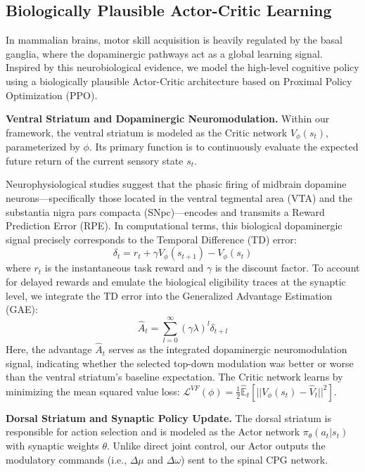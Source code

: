 \documentclass[lettersize,journal]{IEEEtran}
\begin{document}
\subsection{Biologically Plausible Actor-Critic Learning}

In mammalian brains, motor skill acquisition is heavily regulated by the basal ganglia, where the dopaminergic pathways act as a global learning signal. 
Inspired by this neurobiological evidence, we model the high-level cognitive policy using a biologically plausible Actor-Critic architecture based on Proximal Policy Optimization (PPO).

\textbf{Ventral Striatum and Dopaminergic Neuromodulation.}
Within our framework, the ventral striatum is modeled as the Critic network $V_\phi(s_t)$, parameterized by $\phi$. 
Its primary function is to continuously evaluate the expected future return of the current sensory state $s_t$. 

Neurophysiological studies suggest that the phasic firing of midbrain dopamine neurons—specifically those located in the ventral tegmental area (VTA) and the substantia nigra pars compacta (SNpc)—encodes and transmits a Reward Prediction Error (RPE). 
In computational terms, this biological dopaminergic signal precisely corresponds to the Temporal Difference (TD) error:
\begin{equation}
    \delta_t = r_t + \gamma V_\phi(s_{t+1}) - V_\phi(s_t)
\end{equation}
where $r_t$ is the instantaneous task reward and $\gamma$ is the discount factor. 
To account for delayed rewards and emulate the biological eligibility traces at the synaptic level, we integrate the TD error into the Generalized Advantage Estimation (GAE):
\begin{equation} \label{eq:advantage}
    \hat{A}_t = \sum_{l=0}^{\infty} (\gamma \lambda)^l \delta_{t+l}
\end{equation}
Here, the advantage $\hat{A}_t$ serves as the integrated dopaminergic neuromodulation signal, indicating whether the selected top-down modulation was better or worse than the ventral striatum's baseline expectation. 
The Critic network learns by minimizing the mean squared value loss: $\mathcal{L}^{VF}(\phi) = \frac{1}{2} \hat{\mathbb{E}}_t \left[ || V_\phi(s_t) - \hat{V}_t ||^2 \right]$.

\textbf{Dorsal Striatum and Synaptic Policy Update.}
The dorsal striatum is responsible for action selection and is modeled as the Actor network $\pi_\theta(a_t|s_t)$ with synaptic weights $\theta$. 
Unlike direct joint control, our Actor outputs the modulatory commands (i.e., $\Delta \mu$ and $\Delta \omega$) sent to the spinal CPG network.
\end{document}
